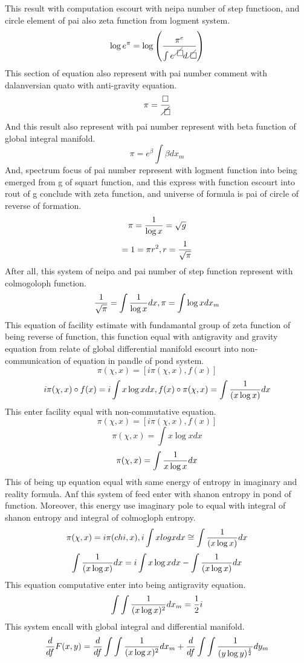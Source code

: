 \documentclass{jsarticle}
\begin{document}
    This result with computation escourt with neipa number of step functioon,
    and circle element of pai also zeta function from logment system.
    $$ \log e^{\pi} = \log \left({\pi^{e} \over {{\int e^{\alearletter}
    d\alearletter}}}\right) $$
    This section of equation also represent with pai number comment
    with dalanversian quato with anti-gravity equation.
    $$ \pi = {\square \over {\alearletter}} $$
    And this result also represent with pai number represent with
    beta function of global integral manifold.
    $$ \pi = e^{\beta}\int \beta dx_m $$
    And, spectrum focus of pai number represent with logment function
    into being emerged from g of squart function, and
    this express with function escourt into rout of g conclude with
    zeta function, and universe of formula is pai of circle of reverse
    of formation.
    $$ \pi = {1 \over {\log x}} = \sqrt{g} $$
    $$ = 1 = \pi r^2, r = {1 \over {\sqrt{\pi}}} $$
    After all, this system of neipa and pai number of step function
    represent with colmogoloph function.
    $$ {1 \over {\sqrt{\pi}}} = \int {1 \over {\log x}}dx, 
    \pi = \int \log x dx_m $$
    This equation of facility estimate with fundamantal group of zeta
    function of being reverse of function, this function equal with 
    antigravity and gravity equation from relate of global differential
    manifold escourt into non-communication of equation in pandle of pond
    system.
    $$ \pi(\chi,x) = [i\pi(\chi,x),f(x)] $$
    $$i \pi(\chi,x)\circ f(x) = i\int x\log xdx, f(x)\circ
    \pi(\chi,x) = \int {1 \over {(x\log x)}}dx $$
    This enter facility equal with non-commutative equation.
    $$ \pi(\chi,x) = [i\pi(\chi,x),f(x)] $$
    $$ \pi(\chi,x) = \int x \log xdx $$
    $$ \pi(\chi,x) = \int {1 \over {x \log x}}dx $$
    This of being up equation equal with same energy of entropy in 
    imaginary and reality formula. Anf this system of feed enter with
    shanon entropy in pond of function. Moreover, this energy use
    imaginary pole to equal with integral of shanon entropy and integral
    of colmogloph entropy.
    $$ \pi(\chi,x) = i\pi(chi,x), i\int xlog xdx \cong \int
    {1 \over {(x\log x)}}dx $$
    $$ \int {1 \over {(x\log x)}}dx=i \int x \log xdx - \int{1 \over {
	    (x \log x)}}dx $$
    This equation computative enter into being antigravity equation.
    $$ \int \int {1 \over {(x\log x)^{2}}}dx_m = {1 \over 2}i $$
    This system encall with global integral and differential manifold.
    $$ {d \over {d f}}F(x,y) = {d \over {d f}}\int\int{
	    1 \over {(x\log x)^{2}}}dx_m
    + {d \over {d f}}\int\int{1 \over {(y\log y)^{1 \over 2}}}dy_m $$ 
\end{document}
